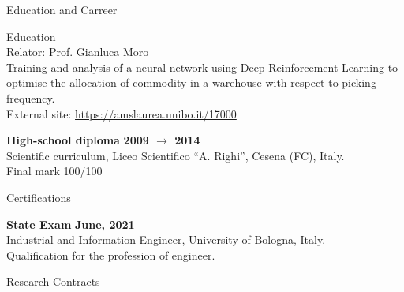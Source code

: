 \documentclass{resume} %
\begin{document}
\begin{rSection}{Education and Carreer}
\begin{rSubsection2}{Education}
            \\Relator: Prof. Gianluca Moro
            \\Training and analysis of a neural network using Deep Reinforcement Learning to optimise the allocation of commodity in a warehouse with respect to picking frequency.
            \\External site: \url{https://amslaurea.unibo.it/17000}
            \item\textbf{ High-school diploma }\hfill \textbf{2009 $\rightarrow$ 2014}
            \\Scientific curriculum, Liceo Scientifico ``A. Righi'', Cesena (FC), Italy.
            \\Final mark 100/100
        \end{rSubsection2}


        \begin{rSubsection2}{Certifications}

            \item\textbf{ State Exam }\hfill \textbf{June, 2021}
            \\Industrial and Information Engineer, University of Bologna, Italy.
            \\Qualification for the profession of engineer.

        \end{rSubsection2}


        \begin{rSubsection2}{Research Contracts}


\end{rSubsection2}
\end{rSection}
\end{document}

